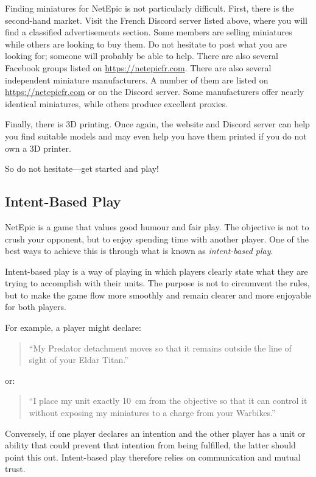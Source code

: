 Finding miniatures for NetEpic is not particularly difficult. First, there is the second-hand market. Visit the French Discord server listed above, where you will find a classified advertisements section. Some members are selling miniatures while others are looking to buy them. Do not hesitate to post what you are looking for; someone will probably be able to help. There are also several Facebook groups listed on \url{https://netepicfr.com}.
There are also several independent miniature manufacturers. 
A number of them are listed on \url{https://netepicfr.com} or on the Discord server. 
Some manufacturers offer nearly identical miniatures, while others produce excellent proxies.

Finally, there is 3D printing. Once again, the website and Discord server can help you find suitable models and may even help you have them printed if you do not own a 3D printer.

So do not hesitate---get started and play!

\subsection{Intent-Based Play}

NetEpic is a game that values good humour and fair play. The objective is not to crush your opponent, but to enjoy spending time with another player. One of the best ways to achieve this is through what is known as \textit{intent-based play}.

Intent-based play is a way of playing in which players clearly state what they are trying to accomplish with their units. The purpose is not to circumvent the rules, but to make the game flow more smoothly and remain clearer and more enjoyable for both players.

For example, a player might declare:

\begin{quote}
    ``My Predator detachment moves so that it remains outside the line of sight of your Eldar Titan.''
\end{quote}

or:

\begin{quote}
    ``I place my unit exactly 10~cm from the objective so that it can control it without exposing my miniatures to a charge from your Warbikes.''
\end{quote}

Conversely, if one player declares an intention and the other player has a unit or ability that could prevent that intention from being fulfilled, the latter should point this out. Intent-based play therefore relies on communication and mutual trust.

